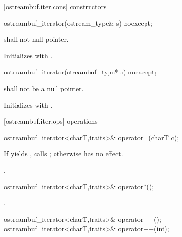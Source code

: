 [ostreambuf.iter.cons]{ constructors}


%
\begin{itemdecl}
ostreambuf_iterator(ostream_type& s) noexcept;
\end{itemdecl}

\begin{itemdescr}
\pnum
\requires
{}
shall not null pointer.
\end{itemdescr}

\begin{itemdescr}
\pnum
\effects
Initializes  with .
\end{itemdescr}


%
\begin{itemdecl}
ostreambuf_iterator(streambuf_type* s) noexcept;
\end{itemdecl}

\begin{itemdescr}
\pnum
\requires
{}
shall not be a null pointer.

\pnum
\effects
Initializes  with .
\end{itemdescr}

[ostreambuf.iter.ops]{ operations}

%
\begin{itemdecl}
ostreambuf_iterator<charT,traits>&
  operator=(charT c);
\end{itemdecl}

\begin{itemdescr}
\pnum
\effects
If
yields
,
calls
;
otherwise has no effect.

\pnum
\returns
{}.
\end{itemdescr}

%
\begin{itemdecl}
ostreambuf_iterator<charT,traits>& operator*();
\end{itemdecl}

\begin{itemdescr}
\pnum
\returns
{}.
\end{itemdescr}

%
\begin{itemdecl}
ostreambuf_iterator<charT,traits>& operator++();
ostreambuf_iterator<charT,traits>& operator++(int);
\end{itemdecl}

